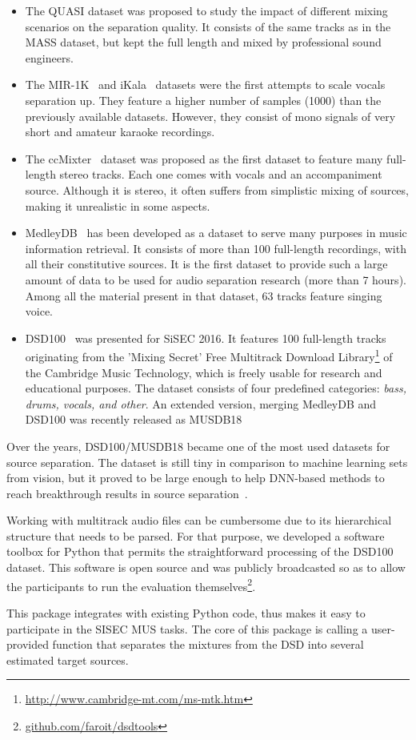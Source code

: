 \begin{itemize}[leftmargin=*]
    \item The QUASI dataset was proposed to study the impact of different mixing scenarios on the separation quality. It consists of the same tracks as in the MASS dataset, but kept the full length and mixed by professional sound engineers.
    \item The MIR-1K~\cite{hsu10} and iKala~\cite{chan15} datasets were the first attempts to scale vocals separation up. They feature a higher number of samples (1000) than the previously available datasets. However, they consist of mono signals of very short and amateur karaoke recordings.
    \item The ccMixter~\cite{liutkus142} dataset was proposed as the first dataset to feature many full-length stereo tracks. Each one comes with vocals and an accompaniment source. Although it is stereo, it often suffers from simplistic mixing of sources, making it unrealistic in some aspects.
    \item MedleyDB~\cite{bittner14} has been developed as a dataset to serve many purposes in music information retrieval. It consists of more than 100 full-length recordings, with all their constitutive sources. It is the first dataset to provide such a large amount of data to be used for audio separation research (more than 7 hours). Among all the material present in that dataset, 63 tracks feature singing voice.
    \item DSD100~\cite{liutkus17} was presented for SiSEC 2016. It features 100 full-length tracks originating from the 'Mixing Secret' Free Multitrack Download Library\footnote{\url{http://www.cambridge-mt.com/ms-mtk.htm}} of the Cambridge Music Technology, which is freely usable for research and educational purposes.
    The dataset consists of four predefined categories: \emph{bass, drums, vocals, and other}. An extended version, merging MedleyDB and DSD100 was recently released as MUSDB18~\cite{rafii17, stoeter18sisec}
\end{itemize}

Over the years, DSD100/MUSDB18 became one of the most used datasets for source separation. 
The dataset is still tiny in comparison to machine learning sets from vision, but it proved to be large enough to help DNN-based methods to reach breakthrough results in source separation~\cite{stoeter18sisec}.
\par
Working with multitrack audio files can be cumbersome due to its hierarchical structure that needs to be parsed.
For that purpose, we developed a software toolbox for Python that permits the straightforward processing of the DSD100 dataset. This software is open source and was publicly broadcasted so as to allow the participants to run the evaluation themselves\footnote{\url{github.com/faroit/dsdtools}}.
\par
This package integrates with existing Python code, thus makes it easy to participate in the SISEC MUS tasks. The core of this package is calling a user-provided function that separates the mixtures from the DSD into several estimated target sources.

